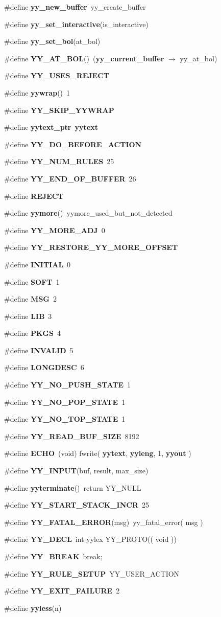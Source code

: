 \begin{CompactItemize}
\#define {\bf yy\_\-new\_\-buffer}\ yy\_\-create\_\-buffer
\item 
\#define {\bf yy\_\-set\_\-interactive}(is\_\-interactive)
\item 
\#define {\bf yy\_\-set\_\-bol}(at\_\-bol)
\item 
\#define {\bf YY\_\-AT\_\-BOL}()\ ({\bf yy\_\-current\_\-buffer} $\rightarrow$ yy\_\-at\_\-bol)
\item 
\#define {\bf YY\_\-USES\_\-REJECT}
\item 
\#define {\bf yywrap}()\ 1
\item 
\#define {\bf YY\_\-SKIP\_\-YYWRAP}
\item 
\#define {\bf yytext\_\-ptr}\ {\bf yytext}
\item 
\#define {\bf YY\_\-DO\_\-BEFORE\_\-ACTION}
\item 
\#define {\bf YY\_\-NUM\_\-RULES}\ 25
\item 
\#define {\bf YY\_\-END\_\-OF\_\-BUFFER}\ 26
\item 
\#define {\bf REJECT}
\item 
\#define {\bf yymore}()\ yymore\_\-used\_\-but\_\-not\_\-detected
\item 
\#define {\bf YY\_\-MORE\_\-ADJ}\ 0
\item 
\#define {\bf YY\_\-RESTORE\_\-YY\_\-MORE\_\-OFFSET}
\item 
\#define {\bf INITIAL}\ 0
\item 
\#define {\bf SOFT}\ 1
\item 
\#define {\bf MSG}\ 2
\item 
\#define {\bf LIB}\ 3
\item 
\#define {\bf PKGS}\ 4
\item 
\#define {\bf INVALID}\ 5
\item 
\#define {\bf LONGDESC}\ 6
\item 
\#define {\bf YY\_\-NO\_\-PUSH\_\-STATE}\ 1
\item 
\#define {\bf YY\_\-NO\_\-POP\_\-STATE}\ 1
\item 
\#define {\bf YY\_\-NO\_\-TOP\_\-STATE}\ 1
\item 
\#define {\bf YY\_\-READ\_\-BUF\_\-SIZE}\ 8192
\item 
\#define {\bf ECHO}\ (void) fwrite( {\bf yytext}, {\bf yyleng}, 1, {\bf yyout} )
\item 
\#define {\bf YY\_\-INPUT}(buf, result, max\_\-size)
\item 
\#define {\bf yyterminate}()\ return YY\_\-NULL
\item 
\#define {\bf YY\_\-START\_\-STACK\_\-INCR}\ 25
\item 
\#define {\bf YY\_\-FATAL\_\-ERROR}(msg)\ yy\_\-fatal\_\-error( msg )
\item 
\#define {\bf YY\_\-DECL}\ int yylex YY\_\-PROTO(( void ))
\item 
\#define {\bf YY\_\-BREAK}\ break;
\item 
\#define {\bf YY\_\-RULE\_\-SETUP}\ YY\_\-USER\_\-ACTION
\item 
\#define {\bf YY\_\-EXIT\_\-FAILURE}\ 2
\item 
\#define {\bf yyless}(n)
\end{CompactItemize}
